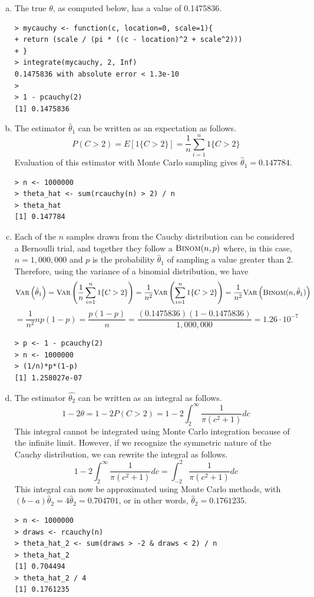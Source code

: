 \documentclass[a4paper, 10pt]{article}
\newcounter{prob_num}
\begin{document}
\begin{enumerate}[(a)]
\item The true $\theta$, as computed below, has a value of 0.1475836.
\begin{verbatim}
> mycauchy <- function(c, location=0, scale=1){
+ return (scale / (pi * ((c - location)^2 + scale^2)))
+ }
> integrate(mycauchy, 2, Inf)
0.1475836 with absolute error < 1.3e-10
>
> 1 - pcauchy(2)
[1] 0.1475836
\end{verbatim}

\item The estimator $\hat{\theta}_1$ can be written as an expectation as follows. \[ P(C > 2) = E[1\{C > 2\}] = \frac{1}{n}\sum_{i=1}^n1\{C > 2\} \] Evaluation of this estimator with Monte Carlo sampling gives $\hat{\theta}_1 = 0.147784$.
\begin{verbatim}
> n <- 1000000
> theta_hat <- sum(rcauchy(n) > 2) / n
> theta_hat
[1] 0.147784
\end{verbatim}

\item Each of the $n$ samples drawn from the Cauchy distribution can be considered a Bernoulli trial, and together they follow a $\textsc{Binom}(n, p)$ where, in this case, $n = 1,000,000$ and $p$ is the probability $\hat{\theta}_1$ of sampling a value greater than 2. Therefore, using the variance of a binomial distribution, we have \[ \textsc{Var}\left(\hat{\theta}_1\right) = \textsc{Var}\left(\frac{1}{n}\sum_{i=1}^{n}1\{C > 2\}\right) = \frac{1}{n^2}\textsc{Var}\left(\sum_{i=1}^{n}1\{C > 2\}\right) = \frac{1}{n^2}\textsc{Var}\left(\textsc{Binom}(n, \hat{\theta}_1)\right) \]\[ = \frac{1}{n^2}np(1-p) = \frac{p(1-p)}{n} = \frac{(0.1475836)(1-0.1475836)}{1,000,000} = 1.26 \cdot 10^{-7} \]
\begin{verbatim}
> p <- 1 - pcauchy(2)
> n <- 1000000
> (1/n)*p*(1-p)
[1] 1.258027e-07
\end{verbatim}

\item The estimator $\hat{\theta_2}$ can be written as an integral as follows. \[ 1-2\theta = 1-2P(C > 2) = 1 - 2 \int_{2}^{\infty}\frac{1}{\pi(c^2+1)}dc \]
This integral cannot be integrated using Monte Carlo integration because of the infinite limit. However, if we recognize the symmetric nature of the Cauchy distribution, we can rewrite the integral as follows. \[ 1 - 2 \int_{2}^{\infty}\frac{1}{\pi(c^2+1)}dc = \int_{-2}^{2}\frac{1}{\pi(c^2+1)}dc \]
This integral can now be approximated using Monte Carlo methods, with $(b-a)\hat{\theta}_2 = 4\hat{\theta}_2 = 0.704701$, or in other words, $\hat{\theta}_2 = 0.1761235$.
\begin{verbatim}
> n <- 1000000
> draws <- rcauchy(n)
> theta_hat_2 <- sum(draws > -2 & draws < 2) / n
> theta_hat_2
[1] 0.704494
> theta_hat_2 / 4
[1] 0.1761235
\end{verbatim}



\end{enumerate}
\end{document}
